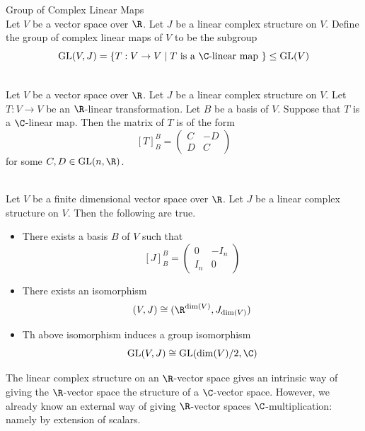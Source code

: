 \documentclass[a4paper]{article}
\begin{document}
\begin{defn}{Group of Complex Linear Maps}{}\\
Let $V$ be a vector space over $\R$. Let $J$ be a linear complex structure on $V$. Define the group of complex linear maps of $V$ to be the subgroup $$\text{GL}(V,J)=\{T:V\to V\;|\;T\text{ is a }\C\text{-linear map }\}\leq\text{GL}(V)$$
\end{defn}

\begin{prp}{}{}\\
Let $V$ be a vector space over $\R$. Let $J$ be a linear complex structure on $V$. Let $T:V\to V$ be an $\R$-linear transformation. Let $B$ be a basis of $V$. Suppose that $T$ is a $\C$-linear map. Then the matrix of $T$ is of the form $$[T]_B^B=\begin{pmatrix}
C & -D\\
D & C
\end{pmatrix}$$ for some $C,D\in\text{GL}(n,\R)$. 
\end{prp}

\begin{thm}{}{}\\
Let $V$ be a finite dimensional vector space over $\R$. Let $J$ be a linear complex structure on $V$. Then the following are true. 
\begin{itemize}
\item There exists a basis $B$ of $V$ such that $$[J]_B^B=\begin{pmatrix}
0 & -I_n\\
I_n & 0
\end{pmatrix}$$
\item There exists an isomorphism $$(V,J)\cong(\R^{\dim(V)},J_{\dim(V)})$$
\item Th above isomorphism induces a group isomorphism $$\text{GL}(V,J)\cong\text{GL}(\dim(V)/2,\C)$$
\end{itemize}
\end{thm}

The linear complex structure on an $\R$-vector space gives an intrinsic way of giving the $\R$-vector space the structure of a $\C$-vector space. However, we already know an external way of giving $\R$-vector spaces $\C$-multiplication: namely by extension of scalars. 
\end{document}
